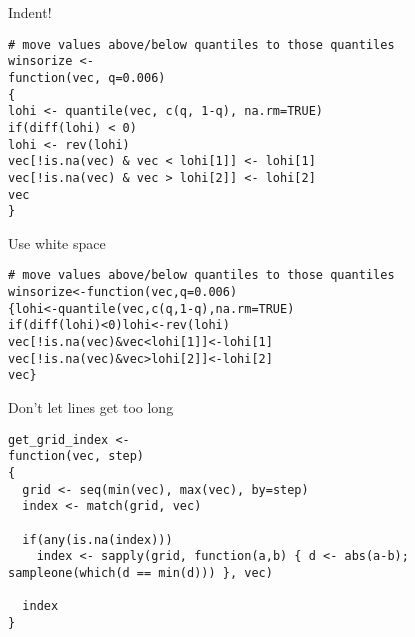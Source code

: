 \documentclass[12pt,t]{beamer}
\begin{document}
\begin{frame}[fragile,c]{Indent!}

\begin{lstlisting}
# move values above/below quantiles to those quantiles
winsorize <-
function(vec, q=0.006)
{
lohi <- quantile(vec, c(q, 1-q), na.rm=TRUE)
if(diff(lohi) < 0)
lohi <- rev(lohi)
vec[!is.na(vec) & vec < lohi[1]] <- lohi[1]
vec[!is.na(vec) & vec > lohi[2]] <- lohi[2]
vec
}
\end{lstlisting}

\end{frame}



\begin{frame}[fragile,c]{Use white space}

\begin{lstlisting}
# move values above/below quantiles to those quantiles
winsorize<-function(vec,q=0.006)
{lohi<-quantile(vec,c(q,1-q),na.rm=TRUE)
if(diff(lohi)<0)lohi<-rev(lohi)
vec[!is.na(vec)&vec<lohi[1]]<-lohi[1]
vec[!is.na(vec)&vec>lohi[2]]<-lohi[2]
vec}
\end{lstlisting}

\end{frame}


\begin{frame}[fragile,c]{Don't let lines get too long}

\begin{lstlisting}
get_grid_index <-
function(vec, step)
{
  grid <- seq(min(vec), max(vec), by=step)
  index <- match(grid, vec)

  if(any(is.na(index)))
    index <- sapply(grid, function(a,b) { d <- abs(a-b); sampleone(which(d == min(d))) }, vec)

  index
}
\end{lstlisting}


\end{frame}
\end{document}
